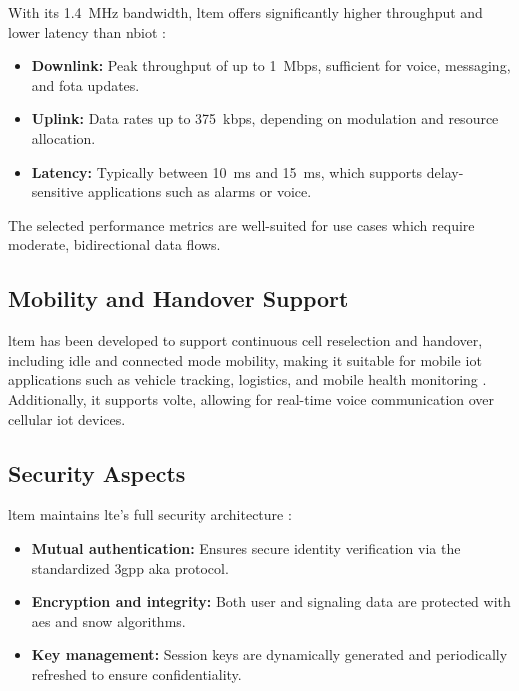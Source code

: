 \documentclass[12pt, english, openany]{book}
\begin{document}
With its \SI{1.4}{MHz} bandwidth, \gls{ltem} offers significantly higher throughput and lower latency than \gls{nbiot} \parencite{LTE_SYSTEM}:

\begin{itemize}
    \item \textbf{Downlink:} Peak throughput of up to \SI{1}{Mbps}, sufficient for voice, messaging, and \gls{fota} updates.
    \item \textbf{Uplink:} Data rates up to \SI{375}{kbps}, depending on modulation and resource allocation.
    \item \textbf{Latency:} Typically between \SI{10}{ms} and \SI{15}{ms}, which supports delay-sensitive applications such as alarms or voice.
\end{itemize}

The selected performance metrics are well-suited for use cases which require moderate, bidirectional data flows.

\subsection{Mobility and Handover Support}

\gls{ltem} has been developed to support continuous cell reselection and handover, including idle and connected mode mobility, making it suitable for mobile \gls{iot} applications such as vehicle tracking, logistics, and mobile health monitoring \parencite{LTE_SYSTEM}. Additionally, it supports \gls{volte}, allowing for real-time voice communication over cellular \gls{iot} devices.

\subsection{Security Aspects}

\gls{ltem} maintains \gls{lte}'s full security architecture \parencite{LTEM_WIKI}:

\begin{itemize}
    \item \textbf{Mutual authentication:} Ensures secure identity verification via the standardized \gls{3gpp} \gls{aka} protocol.
    \item \textbf{Encryption and integrity:} Both user and signaling data are protected with \gls{aes} and \gls{snow} algorithms.
    \item \textbf{Key management:} Session keys are dynamically generated and periodically refreshed to ensure confidentiality.
\end{itemize}
\end{document}
